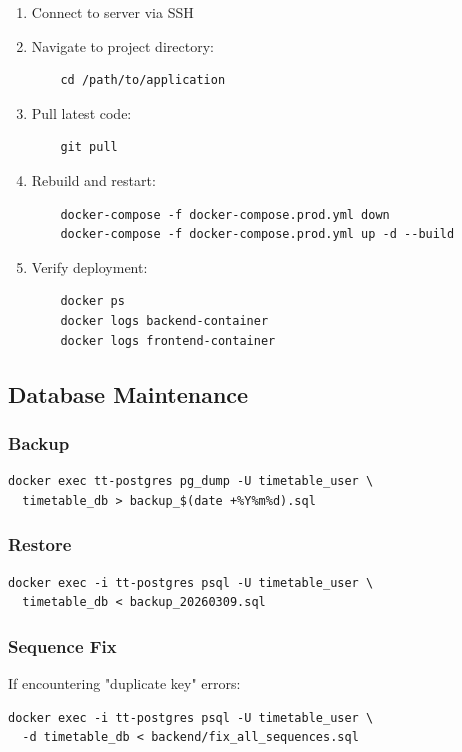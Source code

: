\documentclass[12pt,a4paper]{article}
\begin{document}
\begin{enumerate}
    \item Connect to server via SSH
    
    \item Navigate to project directory:
    \begin{verbatim}
    cd /path/to/application
    \end{verbatim}
    
    \item Pull latest code:
    \begin{verbatim}
    git pull
    \end{verbatim}
    
    \item Rebuild and restart:
    \begin{verbatim}
    docker-compose -f docker-compose.prod.yml down
    docker-compose -f docker-compose.prod.yml up -d --build
    \end{verbatim}
    
    \item Verify deployment:
    \begin{verbatim}
    docker ps
    docker logs backend-container
    docker logs frontend-container
    \end{verbatim}
\end{enumerate}

\subsection{Database Maintenance}

\subsubsection{Backup}
\begin{verbatim}
docker exec tt-postgres pg_dump -U timetable_user \
  timetable_db > backup_$(date +%Y%m%d).sql
\end{verbatim}

\subsubsection{Restore}
\begin{verbatim}
docker exec -i tt-postgres psql -U timetable_user \
  timetable_db < backup_20260309.sql
\end{verbatim}

\subsubsection{Sequence Fix}
If encountering "duplicate key" errors:
\begin{verbatim}
docker exec -i tt-postgres psql -U timetable_user \
  -d timetable_db < backend/fix_all_sequences.sql
\end{verbatim}
\end{document}
